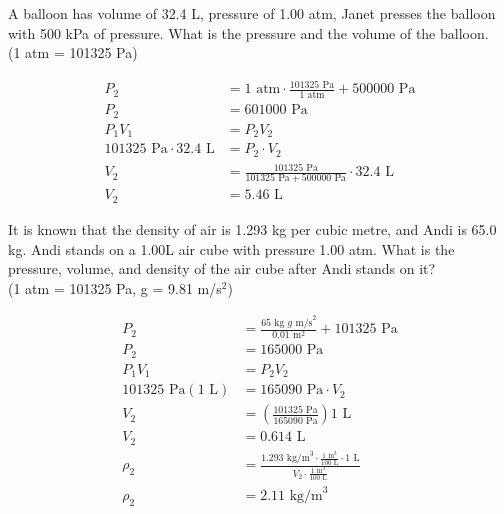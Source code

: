 \documentclass{article}
\begin{document}
\begin{custom-big}[Example 3]
A balloon has volume of 32.4 L, pressure of 1.00 atm, Janet presses the balloon with 500 kPa of pressure. What is the pressure and the volume of the balloon. \\
(1 atm = 101325 Pa)
\end{custom-big}
\begin{solution}
    
\begin{align*}
    P_2&=1\text{ atm}\cdot \frac{101325\text{ Pa}}{1\text{ atm}}+500000\text{ Pa}\\
    P_2&=\boxed{601000\text{ Pa}}\\
    P_1V_1&=P_2V_2\\
    101325\text{ Pa}\cdot 32.4\text{ L}&=P_2\cdot V_2\\
    V_2&=\frac{101325\text{ Pa}}{101325\text{ Pa}+500000\text{ Pa}}\cdot 32.4\text{ L}\\
    V_2&=\boxed{5.46\text{ L}}
\end{align*}
\end{solution}

\begin{custom-big}[Example 4]
It is known that the density of air is 1.293 kg per cubic metre, and Andi is 65.0 kg. Andi stands on a 1.00L air cube with pressure 1.00 atm. What is the pressure, volume, and density of the air cube after Andi stands on it? \\
(1 atm = 101325 Pa, g = 9.81 m/s$^2$)
\end{custom-big}

\begin{solution}

\begin{align*}
    P_{2}&=\frac{65\text{ kg }g \text{ m/s}^2}{0.01\text{ m}^2}+101325\text{ Pa}\\
    P_2&=\boxed{165000\text{ Pa}}\\
    P_1V_1&=P_2V_2\\
    101325\text{ Pa}(1\text{ L})&=165090\text{ Pa}\cdot V_2\\
    V_2&=\left(\frac{101325\text{ Pa}}{165090 \text{ Pa}}\right)1\text{ L}\\
    V_2&=\boxed{0.614\text{ L}}\\
    \rho_2&=\frac{1.293\text{ kg/m}^3\cdot \frac{1\text{ m}^3}{100\text{ L}}\cdot 1\text{ L}}{V_2\cdot \frac{1\text{ m}^3}{100\text{ L}}}\\
    \rho_2&=\boxed{2.11\text{ kg/m}^3}
\end{align*}
\end{solution}
\end{document}
